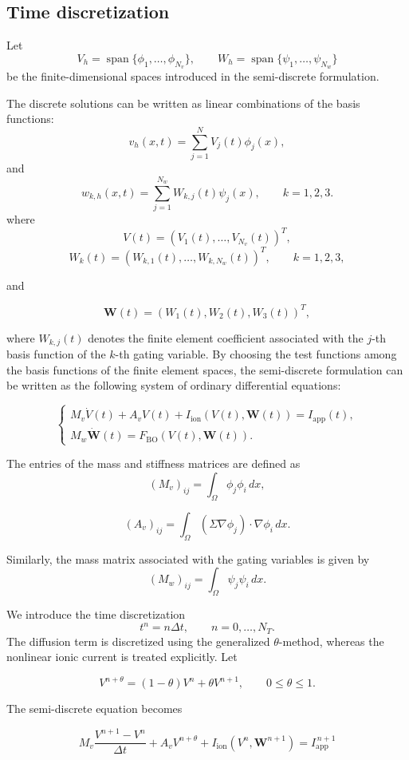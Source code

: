 \documentclass{Configuration_Files/PoliMi3i_thesis}
\begin{document}
\subsection{Time discretization}

Let
\[
V_h=\operatorname{span}\{\phi_1,\ldots,\phi_{N_v}\},
\qquad
W_h=\operatorname{span}\{\psi_1,\ldots,\psi_{N_w}\}
\]
be the finite-dimensional spaces introduced in the semi-discrete formulation.

The discrete solutions can be written as linear combinations of the basis
functions:
\[
v_h(x,t)=\sum_{j=1}^{N}V_j(t)\phi_j(x),
\]
and
\[
w_{k,h}(x,t)
=
\sum_{j=1}^{N_w}
W_{k,j}(t)\psi_j(x),
\qquad k=1,2,3.
\]
where
\[
V(t)=(V_1(t),\ldots,V_{N_v}(t))^T,
\]
\[
W_k(t)=
\left(
W_{k,1}(t),\ldots,W_{k,N_w}(t)
\right)^T,
\qquad k=1,2,3,
\]

and

\[
\mathbf W(t)=
\left(
W_1(t),W_2(t),W_3(t)
\right)^T,
\]

where \(W_{k,j}(t)\) denotes the finite element coefficient associated with the
\(j\)-th basis function of the \(k\)-th gating variable.
By choosing the test functions among the basis functions of the finite
element spaces, the semi-discrete formulation can be written as the
following system of ordinary differential equations:

\[
\begin{cases}
M_v\dot V(t)+A_vV(t)+I_{\mathrm{ion}}(V(t),\mathbf W(t))
=I_{\mathrm{app}}(t),
\\[2mm]
M_w\dot{\mathbf W}(t)
=
F_{\mathrm{BO}}(V(t),\mathbf W(t)).
\end{cases}
\]

The entries of the mass and stiffness matrices are defined as
\[
(M_v)_{ij}=\int_\Omega \phi_j\phi_i\,dx,
\]

\[
(A_v)_{ij}
=
\int_\Omega
(\Sigma\nabla\phi_j)\cdot\nabla\phi_i\,dx.
\]

Similarly, the mass matrix associated with the gating variables is given by
\[
(M_w)_{ij}=\int_\Omega \psi_j\psi_i\,dx.
\]

We introduce the time discretization
\[
t^n=n\Delta t,\qquad n=0,\ldots,N_T.
\]
The diffusion term is discretized using the generalized $\theta$-method, whereas the nonlinear ionic current is treated explicitly. Let

\[
V^{n+\theta}
=
(1-\theta)V^n+\theta V^{n+1},
\qquad
0\le\theta\le1.
\]

The semi-discrete equation becomes

\[
M_v
\frac{V^{n+1}-V^n}{\Delta t}
+
A_vV^{n+\theta}
+
I_{\mathrm{ion}}(V^{n},\mathbf W^{n+1})
=
I_{\mathrm{app}}^{\,n+1}
\]
\end{document}
